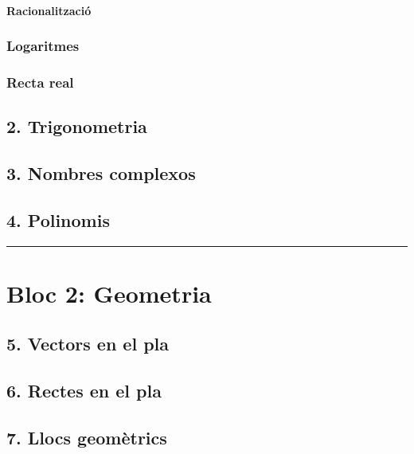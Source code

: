 \documentclass[]{article}
\let\oldparagraph\paragraph
\renewcommand{\paragraph}[1]{\oldparagraph{#1}\mbox{}}
\begin{document}
\paragraph{Racionalització}\label{racionalitzaciuxf3}

\subsubsection{Logaritmes}\label{logaritmes}

\subsubsection{Recta real}\label{recta-real}

\subsection{2. Trigonometria}\label{trigonometria}

\subsection{3. Nombres complexos}\label{nombres-complexos}

\subsection{4. Polinomis}\label{polinomis}

\begin{center}\rule{0.5\linewidth}{\linethickness}\end{center}

\section{Bloc 2: Geometria}\label{bloc-2-geometria}

\subsection{5. Vectors en el pla}\label{vectors-en-el-pla}

\subsection{6. Rectes en el pla}\label{rectes-en-el-pla}

\subsection{7. Llocs geomètrics}\label{llocs-geomuxe8trics}
\end{document}
